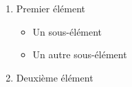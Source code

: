 \documentclass{article}
\begin{document}
\begin{enumerate}
  \item Premier élément
  \begin{itemize}
    \item Un sous-élément
    \item Un autre sous-élément
  \end{itemize}
  \item Deuxième élément
\end{enumerate}
\end{document}
